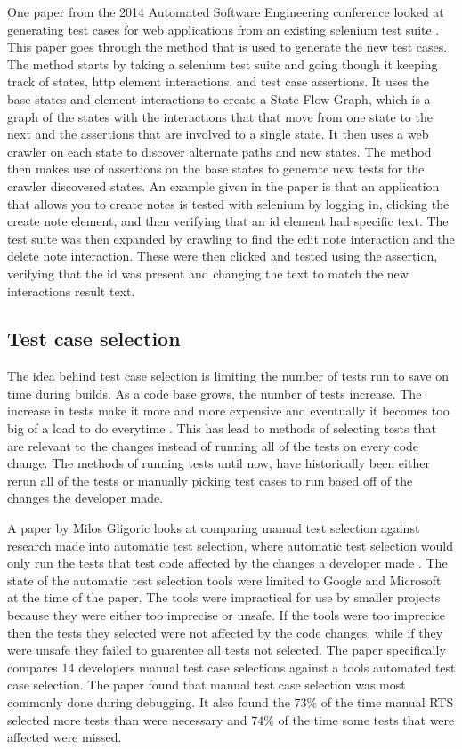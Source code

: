    One paper from the 2014 Automated Software Engineering conference looked at generating test cases for web applications from an existing selenium test suite \cite{WebTestGeneration}. 
    This paper goes through the method that is used to generate the new test cases. The method starts by taking a selenium test suite and going though it keeping track of states, 
    http element interactions, and test case assertions. It uses the base states and element interactions to create a State-Flow Graph, which is a graph of the states with the interactions 
    that that move from one state to the next and the assertions that are involved to a single state. It then uses a web crawler on each state to discover alternate paths and new states. 
    The method then makes use of assertions on the base states to generate new tests for the crawler discovered states. An example given in the paper is that an application that allows you to 
    create notes is tested with selenium by logging in, clicking the create note element, and then verifying that an id element had specific text. The test suite was then expanded by crawling
    to find the edit note interaction and the delete note interaction. These were then clicked and tested using the assertion, verifying that the id was present and changing the text to match the
    new interactions result text.

\subsection{Test case selection}
    The idea behind test case selection is limiting the number of tests run to save on time during builds. As a code base grows, the number of tests increase. The increase in tests make it more 
    and more expensive and eventually it becomes too big of a load to do everytime \cite{googletest, googlescale}. This has lead to methods of selecting tests that are relevant to the changes instead
    of running all of the tests on every code change. The methods of running tests until now, have historically been either rerun all of the tests or manually picking test cases to run based off of 
    the changes the developer made.

    A paper by Milos Gligoric looks at comparing manual test selection against research made into automatic test selection, where automatic test selection would only run the tests that test code
    affected by the changes a developer made \cite{TestCaseSelction}. The state of the automatic test selection tools were limited to Google and Microsoft at the time of the paper. The tools were
    impractical for use by smaller projects because they were either too imprecise or unsafe. If the tools were too imprecice then the tests they selected were not affected by the code changes, while
    if they were unsafe they failed to guarentee all tests not selected. The paper specifically compares 14 developers manual test case selections against a tools automated test case selection. The paper
    found that manual test case selection was most commonly done during debugging. It also found the 73\% of the time manual RTS selected more tests than were necessary and 74\% of the time some tests 
    that were affected were missed.


